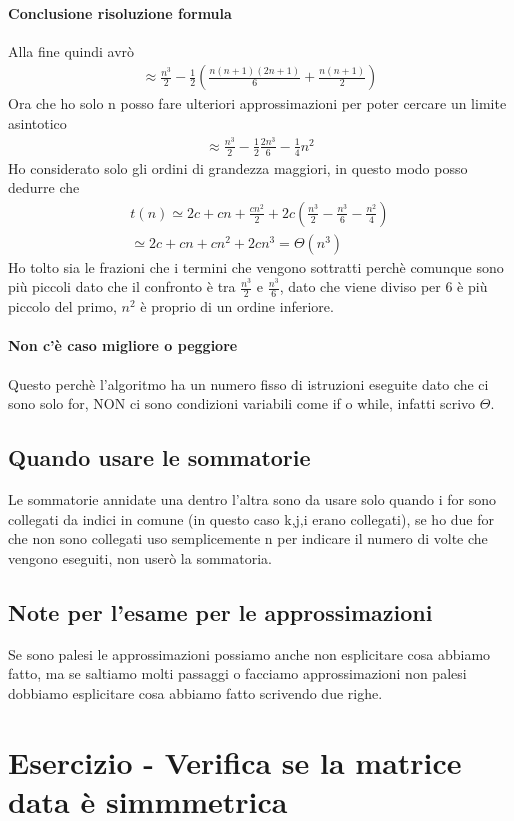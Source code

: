 \paragraph*{Conclusione risoluzione formula} Alla fine quindi avrò
\begin{align*}
    \approx \frac{n^3}{2}-\frac{1}{2}(\frac{n(n+1)(2n+1)}{6}+ 
    \frac{n(n+1)}{2})
\end{align*}
Ora che ho solo n posso fare ulteriori approssimazioni per poter cercare un limite asintotico
\begin{align*}
    \approx \frac{n^3}{2} -\frac{1}{2}\frac{2n^3}{6}-\frac{1}{4}n^2
\end{align*}
Ho considerato solo gli ordini di grandezza maggiori, in questo modo posso dedurre che 
\begin{align*}
    t(n)\simeq 2c+cn+\frac{cn^2}{2} + 2c(\frac{n^3}{2}-\frac{n^3}{6}-\frac{n^2}{4})\\
    \simeq 2c+cn+cn^2+2cn^3 = \Theta(n^3)
\end{align*}
Ho tolto sia le frazioni che i termini che vengono sottratti perchè comunque sono più piccoli dato
che il confronto è tra $\frac{n^3}{2}$ e $\frac{n^3}{6}$, dato che viene diviso per 6 è più piccolo
del primo, $n^2$ è proprio di un ordine inferiore.\\
\paragraph*{Non c'è caso migliore o peggiore} Questo perchè l'algoritmo ha un numero fisso di
istruzioni eseguite dato che ci sono solo for, NON ci sono condizioni variabili come if o while, infatti
scrivo $\Theta$.
\subsection{Quando usare le sommatorie}
Le sommatorie annidate una dentro l'altra sono da usare solo quando i for sono collegati da indici
in comune (in questo caso k,j,i erano collegati), se ho due for che non sono collegati uso semplicemente n per
indicare il numero di volte che vengono eseguiti, non userò la sommatoria.
\subsection{Note per l'esame per le approssimazioni}
Se sono palesi le approssimazioni possiamo anche non esplicitare cosa abbiamo fatto, ma se
saltiamo molti passaggi o facciamo approssimazioni non palesi dobbiamo esplicitare cosa abbiamo fatto scrivendo
due righe.
\section{Esercizio - Verifica se la matrice data è simmmetrica}

